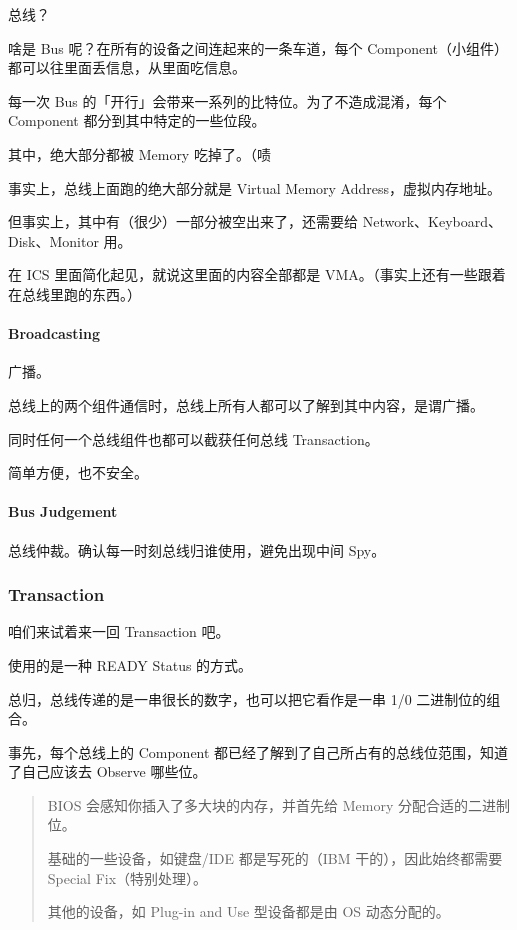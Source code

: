 \documentclass[
]{article}
\begin{document}
总线？

啥是 Bus 呢？在所有的设备之间连起来的一条车道，每个
Component（小组件）都可以往里面丢信息，从里面吃信息。

每一次 Bus 的「开行」会带来一系列的比特位。为了不造成混淆，每个
Component 都分到其中特定的一些位段。

其中，绝大部分都被 Memory 吃掉了。（啧

事实上，总线上面跑的绝大部分就是 Virtual Memory Address，虚拟内存地址。

但事实上，其中有（很少）一部分被空出来了，还需要给
Network、Keyboard、Disk、Monitor 用。

在 ICS 里面简化起见，就说这里面的内容全部都是
VMA。（事实上还有一些跟着在总线里跑的东西。）

\hypertarget{header-n149}{%
\paragraph{Broadcasting}\label{header-n149}}

广播。

总线上的两个组件通信时，总线上所有人都可以了解到其中内容，是谓广播。

同时任何一个总线组件也都可以截获任何总线 Transaction。

简单方便，也不安全。

\hypertarget{header-n154}{%
\paragraph{Bus Judgement}\label{header-n154}}

总线仲裁。确认每一时刻总线归谁使用，避免出现中间 Spy。

\hypertarget{header-n156}{%
\subsubsection{Transaction}\label{header-n156}}

咱们来试着来一回 Transaction 吧。

使用的是一种 READY Status 的方式。

总归，总线传递的是一串很长的数字，也可以把它看作是一串 1/0
二进制位的组合。

事先，每个总线上的 Component
都已经了解到了自己所占有的总线位范围，知道了自己应该去 Observe 哪些位。

\begin{quote}
BIOS 会感知你插入了多大块的内存，并首先给 Memory 分配合适的二进制位。

基础的一些设备，如键盘/IDE 都是写死的（IBM 干的），因此始终都需要
Special Fix（特别处理）。

其他的设备，如 Plug-in and Use 型设备都是由 OS 动态分配的。
\end{quote}
\end{document}
